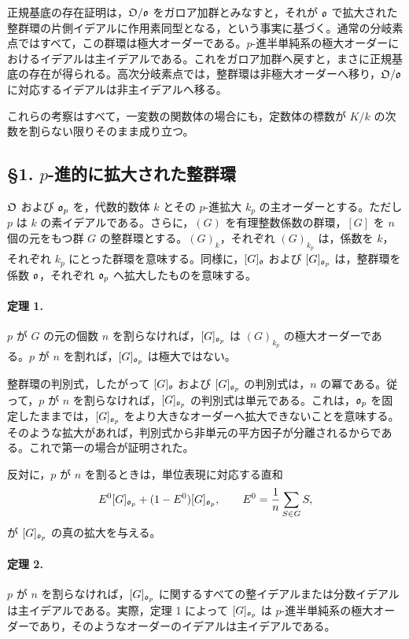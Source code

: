 正規基底の存在証明は，\(\mathfrak O/\mathfrak o\) をガロア加群とみなすと，それが \(\mathfrak o\) で拡大された整群環の片側イデアルに作用素同型となる，という事実に基づく。通常の分岐素点ではすべて，この群環は極大オーダーである。\(p\)-進半単純系の極大オーダーにおけるイデアルは主イデアルである。これをガロア加群へ戻すと，まさに正規基底の存在が得られる。高次分岐素点では，整群環は非極大オーダーへ移り，\(\mathfrak O/\mathfrak o\) に対応するイデアルは非主イデアルへ移る。

これらの考察はすべて，一変数の関数体の場合にも，定数体の標数が \(K/k\) の次数を割らない限りそのまま成り立つ。

\subsection*{§1. \(p\)-進的に拡大された整群環}

\(\mathfrak O\) および \(\mathfrak o_p\) を，代数的数体 \(k\) とその \(p\)-進拡大 \(k_p\) の主オーダーとする。ただし \(p\) は \(k\) の素イデアルである。さらに，\((G)\) を有理整数係数の群環，\([G]\) を \(n\) 個の元をもつ群 \(G\) の整群環とする。\((G)_k\)，それぞれ \((G)_{k_p}\) は，係数を \(k\)，それぞれ \(k_p\) にとった群環を意味する。同様に，\([G]_{\mathfrak o}\) および \([G]_{\mathfrak o_p}\) は，整群環を係数 \(\mathfrak o\)，それぞれ \(\mathfrak o_p\) へ拡大したものを意味する。

\paragraph{定理 1.}
\(p\) が \(G\) の元の個数 \(n\) を割らなければ，\([G]_{\mathfrak o_p}\) は \((G)_{k_p}\) の極大オーダーである。\(p\) が \(n\) を割れば，\([G]_{\mathfrak o_p}\) は極大ではない。

整群環の判別式，したがって \([G]_{\mathfrak o}\) および \([G]_{\mathfrak o_p}\) の判別式は，\(n\) の冪である。従って，\(p\) が \(n\) を割らなければ，\([G]_{\mathfrak o_p}\) の判別式は単元である。これは，\(\mathfrak o_p\) を固定したままでは，\([G]_{\mathfrak o_p}\) をより大きなオーダーへ拡大できないことを意味する。そのような拡大があれば，判別式から非単元の平方因子が分離されるからである。これで第一の場合が証明された。

反対に，\(p\) が \(n\) を割るときは，単位表現に対応する直和
\[
        E^0 [G]_{\mathfrak o_p}+(1-E^0)[G]_{\mathfrak o_p},
        \qquad
        E^0=\frac1n\sum_{S\in G}S,
\]
が \([G]_{\mathfrak o_p}\) の真の拡大を与える。

\paragraph{定理 2.}
\(p\) が \(n\) を割らなければ，\([G]_{\mathfrak o_p}\) に関するすべての整イデアルまたは分数イデアルは主イデアルである。実際，定理 1 によって \([G]_{\mathfrak o_p}\) は \(p\)-進半単純系の極大オーダーであり，そのようなオーダーのイデアルは主イデアルである。

